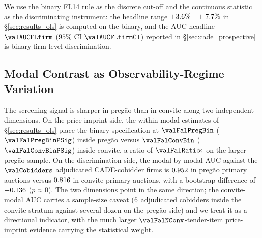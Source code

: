 

We use the binary FL14 rule as the discrete cut-off and the
continuous statistic as the discriminating instrument: the
headline range $+3.6\%\,\text{--}\,+7.7\%$ in \S\ref{sec:results_ols} is
computed on the binary, and the AUC headline $\valAUCFLfirm$
($95\%$ CI $\valAUCFLfirmCI$) reported in
\S\ref{sec:cade_prospective} is binary firm-level discrimination.

\subsection{Modal Contrast as Observability-Regime Variation}
\label{sec:mech_modal}

The screening signal is sharper in preg\~ao than in convite
along two independent dimensions. On the price-imprint side, the
within-modal estimates of \S\ref{sec:results_ols} place the
binary specification at $\valFalPregBin$ ($\valFalPregBinPSig$)
inside preg\~ao versus $\valFalConvBin$ ($\valFalConvBinPSig$)
inside convite, a ratio of $\valFalRatio\!\!\times$ on the larger
preg\~ao sample. On the discrimination side, the modal-by-modal
AUC against the $\valCobidders$ adjudicated CADE-cobidder firms
is $0.952$ in preg\~ao primary auctions versus
$0.816$ in convite primary auctions, with a bootstrap
difference of $-0.136$ ($p\approx 0$). The two
dimensions point in the same direction; the convite-modal AUC
carries a sample-size caveat ($6$ adjudicated
cobidders inside the convite stratum against several dozen on
the preg\~ao side) and we treat it as a directional indicator,
with the much larger $\valFalNConv$-tender-item price-imprint
evidence carrying the statistical weight.

